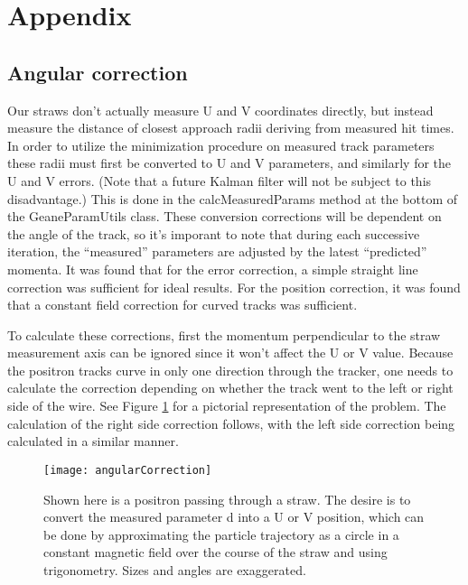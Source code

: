 \appendix
\section{Appendix}
\label{sec:Appendix}

  \subsection{Angular correction}

  Our straws don't actually measure U and V coordinates directly, but instead measure the distance of closest approach radii deriving from measured hit times. In order to utilize the minimization procedure on measured track parameters these radii must first be converted to U and V parameters, and similarly for the U and V errors. (Note that a future Kalman filter will not be subject to this disadvantage.) This is done in the calcMeasuredParams method at the bottom of the GeaneParamUtils class. These conversion corrections will be dependent on the angle of the track, so it's imporant to note that during each successive iteration, the ``measured'' parameters are adjusted by the latest ``predicted'' momenta. It was found that for the error correction, a simple straight line correction was sufficient for ideal results. For the position correction, it was found that a constant field correction for curved tracks was sufficient.

  To calculate these corrections, first the momentum perpendicular to the straw measurement axis can be ignored since it won't affect the U or V value. Because the positron tracks curve in only one direction through the tracker, one needs to calculate the correction depending on whether the track went to the left or right side of the wire. See Figure \ref{fig:angularCorrection} for a pictorial representation of the problem. The calculation of the right side correction follows, with the left side correction being calculated in a similar manner.

	\begin{figure}[]
	\caption{Shown here is a positron passing through a straw. The desire is to convert the measured parameter d into a U or V position, which can be done by approximating the particle trajectory as a circle in a constant magnetic field over the course of the straw and using trigonometry. Sizes and angles are exaggerated.}
	\centering
	\texttt{[image: angularCorrection]}
	\label{fig:angularCorrection}
	\end{figure}

